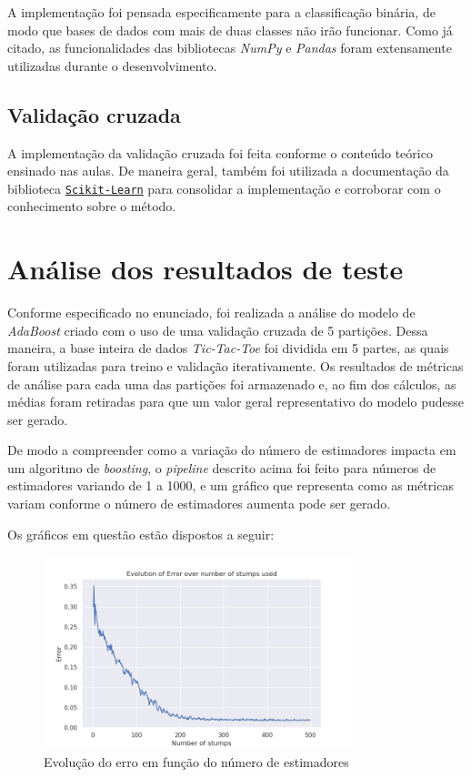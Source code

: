 \documentclass{article}
\begin{document}
A implementação foi pensada especificamente para a classificação binária, de
modo que bases de dados com mais de duas classes não irão funcionar. Como já
citado, as funcionalidades das bibliotecas \textit{NumPy} e \textit{Pandas}
foram extensamente utilizadas durante o desenvolvimento.

\subsection{Validação cruzada}

A implementação da validação cruzada foi feita conforme o conteúdo teórico
ensinado nas aulas. De maneira geral,
também foi utilizada a documentação da biblioteca
\href{https://scikit-learn.org/stable/modules/cross_validation.html}{\texttt{Scikit-Learn}}
para consolidar a implementação e corroborar com o conhecimento sobre o método.

\section{Análise dos resultados de teste}

Conforme especificado no enunciado, foi realizada a análise do modelo de
\textit{AdaBoost} criado com
o uso de uma validação cruzada de 5 partições. Dessa maneira, a base inteira de
dados \textit{Tic-Tac-Toe}
foi dividida em 5 partes, as quais foram utilizadas para treino e validação
iterativamente. Os resultados de métricas
de análise para cada uma das partições foi armazenado e, ao fim dos cálculos,
as médias foram retiradas para que um valor geral representativo
do modelo pudesse ser gerado.

De modo a compreender como a variação do número de estimadores impacta em um
algoritmo de \textit{boosting},
o \textit{pipeline} descrito acima foi feito para números de estimadores
variando de 1 a 1000, e um gráfico que
representa como as métricas variam conforme o número de estimadores aumenta
pode ser gerado.

Os gráficos em questão estão dispostos a seguir:

\begin{figure}[H]
    \centering
    \includegraphics[width=0.8\textwidth]{images/Error.png}
    \caption{Evolução do erro em função do número de estimadores}
\end{figure}
\end{document}
